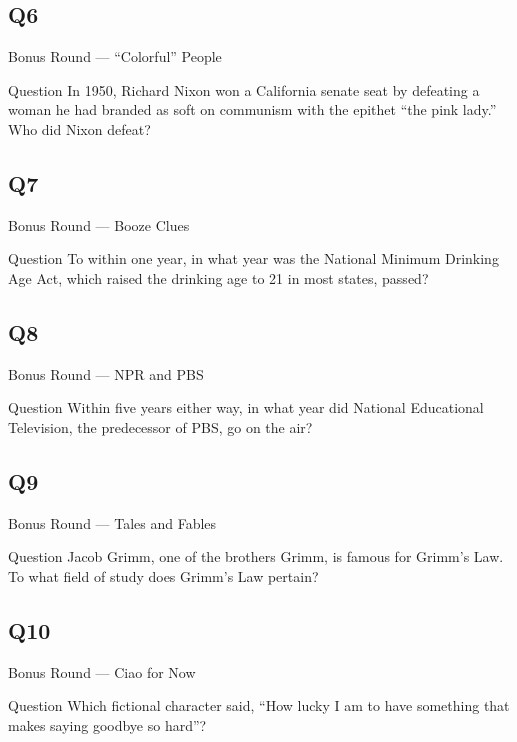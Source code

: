\documentclass[11pt]{beamer}
\begin{document}
\subsection*{Q6}
\begin{frame}[t]{Bonus Round --- ``Colorful'' People}
\vspace{-0.5em}
\begin{block}{Question}
In 1950, Richard Nixon won a California senate seat by defeating a woman he had branded as soft on communism with the epithet ``the pink lady.''  Who did Nixon defeat? 
\end{block}
\end{frame}
\subsection*{Q7}
\begin{frame}[t]{Bonus Round --- Booze Clues}
\vspace{-0.5em}
\begin{block}{Question}
To within one year, in what year was the National Minimum Drinking Age Act, which raised the drinking age to 21 in most states, passed?
\end{block}
\end{frame}
\subsection*{Q8}
\begin{frame}[t]{Bonus Round --- NPR and PBS}
\vspace{-0.5em}
\begin{block}{Question}
Within five years either way, in what year did National Educational Television, the predecessor of PBS, go on the air?
\end{block}
\end{frame}
\subsection*{Q9}
\begin{frame}[t]{Bonus Round --- Tales and Fables}
\vspace{-0.5em}
\begin{block}{Question}
Jacob Grimm, one of the brothers Grimm, is famous for Grimm's Law. To what field of study does Grimm's Law pertain?
\end{block}
\end{frame}
\subsection*{Q10}
\begin{frame}[t]{Bonus Round --- Ciao for Now}
\vspace{-0.5em}
\begin{block}{Question}
Which fictional character said, ``How lucky I am to have something that makes saying goodbye so hard''?
\end{block}
\end{frame}
\end{document}
